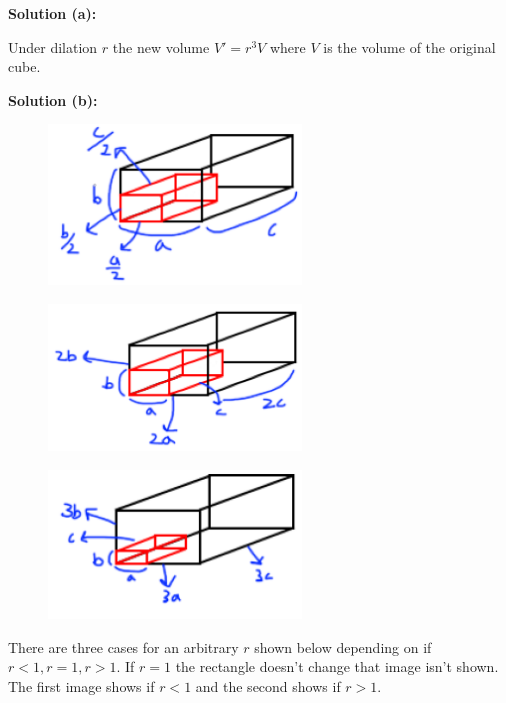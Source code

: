 \textbf{Solution (a):}

Under dilation $r$ the new volume $V' = r^3 V$ where $V$ is the volume 
    of the original cube.

\textbf{Solution (b):}

\begin{figure}[h]
    \centering
    \includegraphics[width=0.6\textwidth]{images/half_rect.png}
\end{figure}

\begin{figure}[h]
    \centering
    \includegraphics[width=0.6\textwidth]{images/2_rect.png}
\end{figure}

\begin{figure}[h]
    \centering
    \includegraphics[width=0.6\textwidth]{images/3_rect.png}
\end{figure}

There are three cases for an arbitrary $r$ shown below
    depending on if $r < 1, r = 1, r > 1$.
If $r = 1$ the rectangle doesn't change that image isn't shown.
The first image shows if $r < 1$ and the second shows if $r > 1$.

